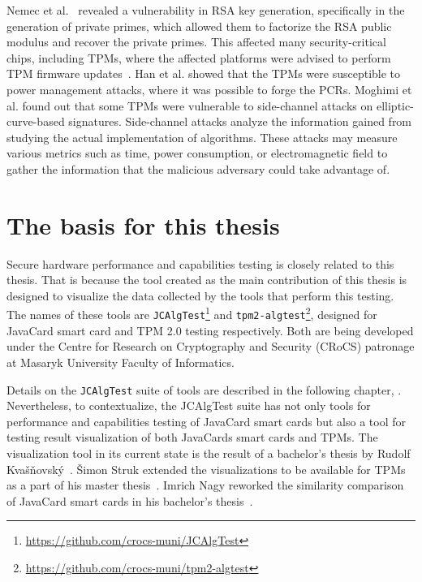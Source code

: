 Nemec et al.~\cite{2017-ccs-nemec} revealed a vulnerability in RSA key generation, specifically in the generation of private primes, which allowed them to factorize the RSA public modulus and recover the private primes. This affected many security-critical chips, including TPMs, where the affected platforms were advised to perform TPM firmware updates~\cite{roca-cve-ms}. Han et al. \cite{han2018sleep} showed that the TPMs were susceptible to power management attacks, where it was possible to forge the PCRs. Moghimi et al. \cite{moghimi2020fail} found out that some TPMs were vulnerable to side-channel attacks on elliptic-curve-based signatures. Side-channel attacks analyze the information gained from studying the actual implementation of algorithms. These attacks may measure various metrics such as time, power consumption, or electromagnetic field to gather the information that the malicious adversary could take advantage of.

\section{The basis for this thesis}
Secure hardware performance and capabilities testing is closely related to this thesis. That is because the tool created as the main contribution of this thesis is designed to visualize the data collected by the tools that perform this testing. The names of these tools are \texttt{JCAlgTest}\footnote{\url{https://github.com/crocs-muni/JCAlgTest}} and \texttt{tpm2-algtest}\footnote{\url{https://github.com/crocs-muni/tpm2-algtest}}, designed for JavaCard smart card and TPM 2.0 testing respectively. Both are being developed under the Centre for Research on Cryptography and Security (CRoCS) patronage at Masaryk University Faculty of Informatics.

Details on the \texttt{JCAlgTest} suite of tools are described in the following chapter, . Nevertheless, to contextualize, the JCAlgTest suite has not only tools for performance and capabilities testing of JavaCard smart cards but also a tool for testing result visualization of both JavaCards smart cards and TPMs. The visualization tool in its current state is the result of a bachelor's thesis by Rudolf Kvašňovský~\cite{Kvasnovsky2016thesis}. Šimon Struk extended the visualizations to be available for TPMs as a part of his master thesis~\cite{Struk2019thesis}. Imrich Nagy reworked the similarity comparison of JavaCard smart cards in his bachelor's thesis~\cite{Nagy2019thesis}.


